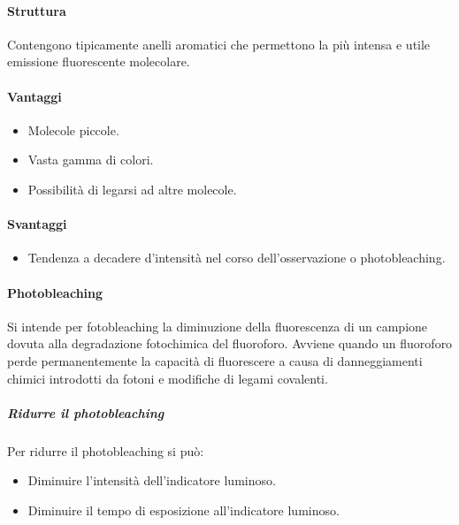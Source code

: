 			\paragraph{Struttura}
			Contengono tipicamente anelli aromatici che permettono la pi\`u intensa e utile emissione fluorescente molecolare.

			\begin{multicols}{2}
				\paragraph{Vantaggi}
				\begin{itemize}
					\item Molecole piccole.
					\item Vasta gamma di colori.
					\item Possibilit\`a di legarsi ad altre molecole.
				\end{itemize}
				
				\paragraph{Svantaggi}
				\begin{itemize}
					\item Tendenza a decadere d'intensit\`a nel corso dell'osservazione o photobleaching.
				\end{itemize}
			\end{multicols}

			\paragraph{Photobleaching}
			Si intende per fotobleaching la diminuzione della fluorescenza di un campione dovuta alla degradazione fotochimica del fluoroforo.
			Avviene quando un fluoroforo perde permanentemente la capacit\`a di fluorescere a causa di danneggiamenti chimici introdotti da fotoni e modifiche di legami covalenti.

				\subparagraph{Ridurre il photobleaching}
				Per ridurre il photobleaching si pu\`o:
		\begin{multicols}{2}
				\begin{itemize}
					\item Diminuire l'intensit\`a dell'indicatore luminoso.
					\item Diminuire il tempo di esposizione all'indicatore luminoso.
				\end{itemize}
			\end{multicols}

